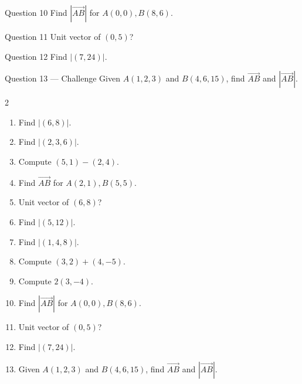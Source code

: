 \documentclass[11pt]{article}
\begin{document}
\begin{qbox}{Question 10}
Find $|\vec{AB}|$ for $A(0,0),B(8,6)$.\workspace{2.4cm}
\end{qbox}

\begin{qbox}{Question 11}
Unit vector of $(0,5)$?\workspace{2.4cm}
\end{qbox}

\begin{qbox}{Question 12}
Find $|(7,24)|$.\workspace{2.4cm}
\end{qbox}

\begin{qbox}{Question 13 --- Challenge}
Given $A(1,2,3)$ and $B(4,6,15)$, find $\vec{AB}$ and $|\vec{AB}|$.\workspace{3cm}
\end{qbox}

\clearpage
{}

\begin{recapbox}
\begin{multicols}{2}
\small
\begin{enumerate}[leftmargin=*,itemsep=3pt]
  \item Find $|(6,8)|$.
  \item Find $|(2,3,6)|$.
  \item Compute $(5,1)-(2,4)$.
  \item Find $\vec{AB}$ for $A(2,1),B(5,5)$.
  \item Unit vector of $(6,8)$?
  \item Find $|(5,12)|$.
  \item Find $|(1,4,8)|$.
  \item Compute $(3,2)+(4,-5)$.
  \item Compute $2(3,-4)$.
  \item Find $|\vec{AB}|$ for $A(0,0),B(8,6)$.
  \item Unit vector of $(0,5)$?
  \item Find $|(7,24)|$.
  \item Given $A(1,2,3)$ and $B(4,6,15)$, find $\vec{AB}$ and $|\vec{AB}|$.
\end{enumerate}
\end{multicols}
\end{recapbox}
\end{document}
